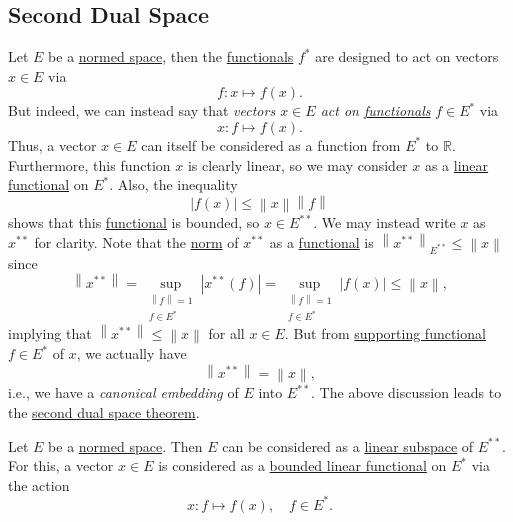 \subsection{Second Dual Space}
Let \(E\) be a \hyperref[def:normed-vector-space]{normed space}, then the \hyperref[def:linear-functional]{functionals} \(f^{\ast} \) are designed to act on vectors \(x\in E\) via
\[
	f\colon x \mapsto f(x).
\]
But indeed, we can instead say that \emph{vectors \(x\in E\) act on \hyperref[def:linear-functional]{functionals}} \(f\in E^{\ast} \) via
\[
	x\colon f\mapsto f(x).
\]
Thus, a vector \(x\in E\) can itself be considered as a function from \(E^{\ast} \) to \(\mathbb{R} \). Furthermore, this function \(x\) is clearly linear, so we may consider \(x\) as a \hyperref[def:linear-functional]{linear functional} on \(E^{\ast} \). Also, the inequality
\[
	\left\vert f(x) \right\vert \leq \left\lVert x\right\rVert \left\lVert f\right\rVert
\]
shows that this \hyperref[def:linear-functional]{functional} is bounded, so \(x\in E^{\ast\ast} \). We may instead write \(x\) as \(x^{\ast\ast} \) for clarity. Note that the \hyperref[def:norm]{norm} of \(x^{\ast\ast} \) as a \hyperref[def:linear-functional]{functional} is \(\left\lVert x^{\ast\ast} \right\rVert _{E^{\ast\ast} } \leq \left\lVert x\right\rVert \) since
\[
	\left\lVert x^{\ast\ast} \right\rVert = \sup _{\substack{\left\lVert f\right\rVert = 1\\ f\in E^{\ast} }}\left\vert x^{\ast\ast} (f) \right\vert = \sup _{\substack{\left\lVert f\right\rVert = 1\\ f\in E^{\ast}}} \left\vert f(x) \right\vert  \leq \left\lVert x\right\rVert,
\]
implying that \(\left\lVert x^{\ast\ast} \right\rVert \leq \left\lVert x\right\rVert \) for all \(x\in E\). But from \hyperref[thm:supporting-functional]{supporting functional} \(f\in E^{\ast} \) of \(x\), we actually have
\[
	\left\lVert x^{\ast\ast} \right\rVert = \left\lVert x\right\rVert,
\]
i.e., we have a \emph{canonical embedding} of \(E\) into \(E^{\ast\ast}\). The above discussion leads to the \hyperref[thm:second-dual-space]{second dual space theorem}.

\begin{theorem}\label{thm:second-dual-space}
	Let \(E\) be a \hyperref[def:normed-vector-space]{normed space}. Then \(E\) can be considered as a \hyperref[def:linear-vector-space]{linear subspace} of \(E^{\ast\ast}\). For this, a vector \(x\in E\) is considered as a \hyperref[def:bounded-linear-functional]{bounded linear functional} on \(E^{\ast} \) via the action
	\[
		x\colon f\mapsto f(x),\quad f\in E^{\ast}.
	\]
\end{theorem}

